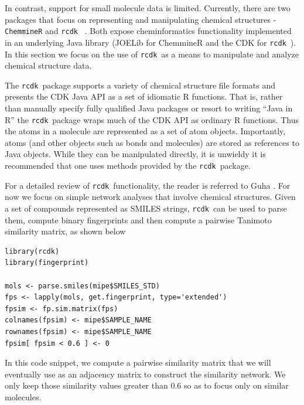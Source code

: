\documentclass[]{book}
\newcommand{\rcdk}{\texttt{rcdk}\ }
\begin{document}
In contrast, support for small molecule data is limited. Currently,
there are two packages that focus on representing and manipulating
chemical structures - \texttt{ChemmineR} \cite{Cao:2008fj} and \rcdk
\cite{Guha:2007aa}. Both expose cheminformatics functionality
implemented in an underlying Java library (JOELib for ChemmineR and
the CDK for \rcdk). In this section we focus on the use of \rcdk as a
means to manipulate and analyze chemical structure data.

The \rcdk package supports a variety of chemical structure file
formats and presents the CDK Java API as a set of idiomatic R
functions. That is, rather than manually specify fully qualified Java
packages or resort to writing ``Java in R'' the \rcdk package wraps
much of the CDK API as ordinary R functions. Thus the atoms in a
molecule are represented as a set of atom objects. Importantly, atoms
(and other objects such as bonds and molecules) are stored as
references to Java objects. While they can be manipulated directly, it
is unwieldy it is recommended that one uses methods provided by the
\rcdk package.

For a detailed review of \rcdk functionality, the reader is referred
to Guha \cite{Guha:2007aa}. For now we focus on simple network
analyses that involve chemical structures. Given a set of compounds
represented as SMILES strings, \rcdk can be used to parse them,
compute binary fingerprints and then compute a pairwise Tanimoto
similarity matrix, as shown below
\begin{lstlisting}
library(rcdk)
library(fingerprint)

mols <- parse.smiles(mipe$SMILES_STD)
fps <- lapply(mols, get.fingerprint, type='extended')
fpsim <- fp.sim.matrix(fps)
colnames(fpsim) <- mipe$SAMPLE_NAME
rownames(fpsim) <- mipe$SAMPLE_NAME
fpsim[ fpsim < 0.6 ] <- 0
\end{lstlisting}
In this code snippet, we compute a pairwise similarity matrix that we
will eventually use as an adjacency matrix to construct the similarity
network. We only keep those similarity values greater than 0.6 so as
to focus only on similar molecules. 
\end{document}

